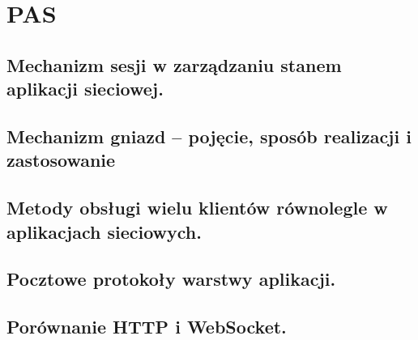 \chapter{PAS}
\section{Mechanizm sesji w zarządzaniu stanem aplikacji sieciowej.}
\section{Mechanizm gniazd – pojęcie, sposób realizacji i zastosowanie }
\section{Metody obsługi wielu klientów równolegle w aplikacjach sieciowych.}
\section{Pocztowe protokoły warstwy aplikacji. }
\section{Porównanie HTTP i WebSocket. }
